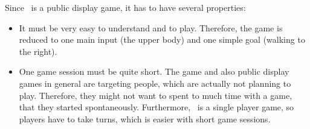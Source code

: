 Since \drunkened\ is a public display game, it has to have several properties:
\begin{itemize}\compresslist
\item It must be very easy to understand and to play. Therefore, the game is reduced to one main input (the upper body) and one simple goal (walking to the right).
\item One game session must be quite short. The game and also public display games in general are targeting people, which are actually not planning to play. Therefore, they might not want to spent to much time with a game, that they started spontaneously. Furthermore, \drunkened\ is a single player game, so players have to take turns, which is easier with short game sessions.
\end{itemize}

